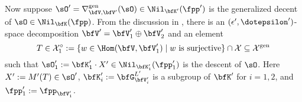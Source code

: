 \documentclass[12pt,a4paper]{amsart}
\newcommand{\CK}{{\mathcal {K}}}
\newcommand{\CX}{{\mathcal {X}}}
\def\gDD{\nabla^{\mathrm{gen}}}
\numberwithin{equation}{section}
\theoremstyle{remark}
\newtheorem*{remark}{Remark}
\def\KV{\bfK_{\bfV}}
\def\KV{\bfK}
\begin{document}





  \medskip
  Now suppose $\sO'=\gDD_{\bfV,\bfV'}(\sO) \in \Nil_{\bfK'}(\fpp')$ is the
  generalized decent of $\sO\in \Nil_{\bfK}(\fpp)$. From the discussion in
  , there is an $(\epsilon',\dotepsilon')$-space decomposition
  $\bfV' = \bfV'_1\oplus \bfV'_2$ and an element
  \[
  T\in
  \CX_1^\circ:=\{w\in\Hom(\bfV,\bfV'_1)\mid w\textrm{ is surjective}\}\cap \CX\subseteq \CX^{\mathrm{gen}}
  \]
   such that
  $\sO'_1:= \bfK'_1 \cdot X' \in \Nil_{\bfK'_1}(\fpp'_1)$ is the descent of
  $\sO$. Here $X' := M'(T)\in \sO'$,
  $\bfK'_i:= \bfG_{\bfV'_i}^{L'}$ is a
  subgroup of $\bfK'$ for $i=1,2$, and $\fpp'_1 := \fpp_{\bfV'_1}$.
\end{document}
